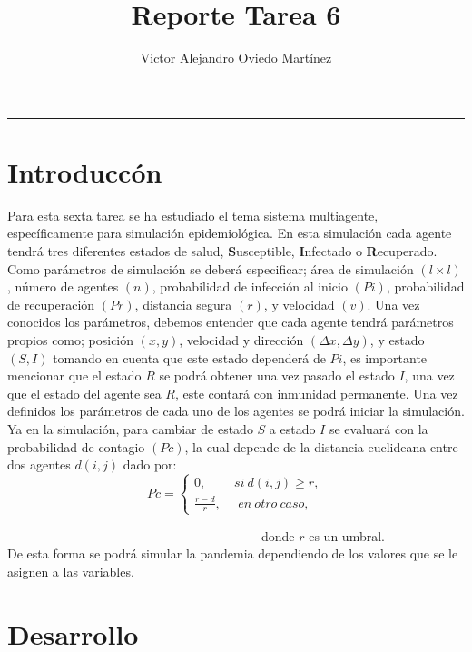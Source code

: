 \documentclass{article}
\title{Reporte Tarea 6}
\author{Victor Alejandro Oviedo Martínez}
\begin{document}
\maketitle
\hrule

\section{Introduccón}\label{intro}
Para esta sexta tarea\citep{DRA.P6} se ha estudiado el tema sistema multiagente, específicamente para simulación epidemiológica. En esta simulación cada agente tendrá tres diferentes estados de salud, \textbf{S}usceptible, \textbf{I}nfectado o \textbf{R}ecuperado. Como parámetros de simulación se deberá especificar; área de simulación $(l  {\times}  l)$, número de agentes $(n)$, probabilidad de infección al inicio $(Pi)$, probabilidad de recuperación $(Pr)$, distancia segura $(r)$, y velocidad $(v)$. Una vez conocidos los parámetros, debemos entender que cada agente tendrá  parámetros propios como; posición $(x,y)$, velocidad y dirección $({\Delta}x,{\Delta}y)$, y estado $(S, I)$ tomando en cuenta que este estado dependerá de $Pi$, es importante mencionar que el estado $R$ se podrá obtener una vez pasado el estado $I$, una vez que el estado del agente sea $R$, este contará con inmunidad permanente. Una vez definidos los parámetros de cada uno de los agentes se podrá iniciar la simulación. Ya en la simulación, para cambiar de estado $S$ a estado $I$ se evaluará con la probabilidad de contagio $(Pc)$, la cual depende de la distancia euclideana entre dos agentes $d(i,j)$ dado por:\\

\begin{equation}
Pc=\left\lbrace\begin{array}{c} 0,~~~~~~~~~~si~d(i,j) \geq r, \\ \frac{r - d}{r},~~~~~~ en~otro~caso, \end{array}\right.
\end{equation}


~~~~~~~~~~~~~~~~~~~~~~~~~~~~~~~~~~~~~~~~donde $r$ es un umbral.\\

De esta forma se podrá simular la pandemia dependiendo de los valores que se le asignen a las variables. 




 

\section{Desarrollo}
\end{document}
